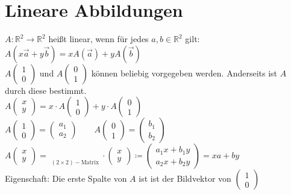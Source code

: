 \section{Lineare Abbildungen}
$A: \mathbb{R}^{2} \rightarrow \mathbb{R}^{2}$ heißt linear, wenn für jedes $a,b \in \mathbb{R}^{2}$ gilt: $A(x\vec{a} + y \vec{b})=xA(\vec{a}) + yA(\vec{b})$\\

$A\begin{pmatrix} 1\\0 \end{pmatrix}$ und $A\begin{pmatrix} 0 \\ 1 \end{pmatrix}$ können beliebig vorgegeben werden. Anderseits ist $A$ durch diese bestimmt.\\

$A\begin{pmatrix} x \\ y \end{pmatrix}= x\cdot A\begin{pmatrix} 1 \\ 0 \end{pmatrix} + y \cdot A\begin{pmatrix} 0 \\ 1 \end{pmatrix}$ \\

$A\begin{pmatrix}1 \\ 0 \end{pmatrix} = \begin{pmatrix} a_{1} \\ a_{2} \end{pmatrix} \qquad A\begin{pmatrix} 0 \\ 1 \end{pmatrix} = \begin{pmatrix} b_{1} \\ b_{2} \end{pmatrix}$ \\

$A\begin{pmatrix} x \\ y \end{pmatrix} = \mathop{\underbrace{\begin{pmatrix} a_{1} & b_{1} \\ a_{2} & b_{2} \end{pmatrix}}}\limits_{(2\times 2) - \textrm{Matrix}} \cdot \begin{pmatrix} x \\ y \end{pmatrix} \coloneq \begin{pmatrix} a_{1}x + b_{1} y \\ a_{2}x + b_{2}y\end{pmatrix} = xa+by$\\
Eigenschaft: Die erste Spalte von $A$ ist ist der Bildvektor von $\begin{pmatrix}1 \\ 0 \end{pmatrix}$
%
%
%
